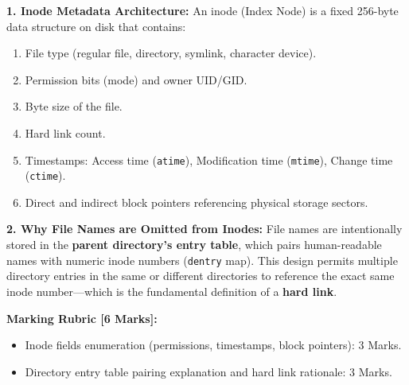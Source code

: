 \begin{examsol}
\textbf{1. Inode Metadata Architecture:}
An inode (Index Node) is a fixed 256-byte data structure on disk that contains:
\begin{enumerate}[leftmargin=1.5em]
    \item File type (regular file, directory, symlink, character device).
    \item Permission bits (mode) and owner UID/GID.
    \item Byte size of the file.
    \item Hard link count.
    \item Timestamps: Access time (\texttt{atime}), Modification time (\texttt{mtime}), Change time (\texttt{ctime}).
    \item Direct and indirect block pointers referencing physical storage sectors.
\end{enumerate}

\textbf{2. Why File Names are Omitted from Inodes:}
File names are intentionally stored in the \textbf{parent directory's entry table}, which pairs human-readable names with numeric inode numbers (\texttt{dentry} map). This design permits multiple directory entries in the same or different directories to reference the exact same inode number—which is the fundamental definition of a \textbf{hard link}.

\begin{markingrubric}
\textbf{Marking Rubric [6 Marks]:}
\begin{itemize}[leftmargin=1.5em]
    \item Inode fields enumeration (permissions, timestamps, block pointers): 3 Marks.
    \item Directory entry table pairing explanation and hard link rationale: 3 Marks.
\end{itemize}
\end{markingrubric}
\end{examsol}


